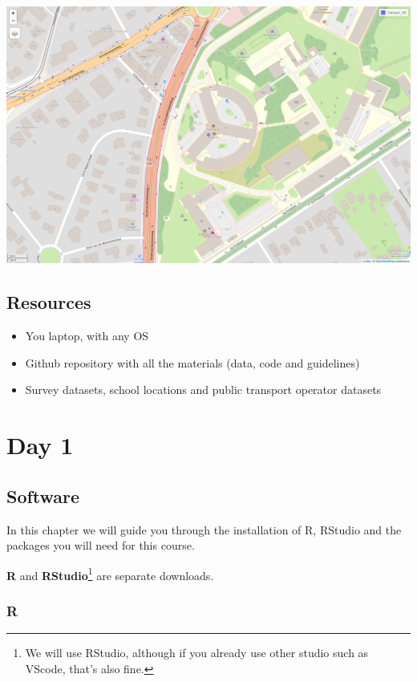 \documentclass[
  letterpaper,
  DIV=11,
  numbers=noendperiod]{scrreprt}
\begin{document}
\includegraphics{structure_files/figure-pdf/unnamed-chunk-1-1.png}


\chapter{Resources}\label{resources}

\begin{itemize}
\item
  You laptop, with any OS
\item
  Github repository with all the materials (data, code and guidelines)
\item
  Survey datasets, school locations and public transport operator
  datasets
\end{itemize}

\part{\textbf{Day 1}}

\chapter{Software}\label{software}

In this chapter we will guide you through the installation of R, RStudio
and the packages you will need for this course.

\textbf{R} and \textbf{RStudio}\footnote{We will use RStudio, although
  if you already use other studio such as VScode, that's also fine.} are
separate downloads.

\section{R}\label{r}
\end{document}

